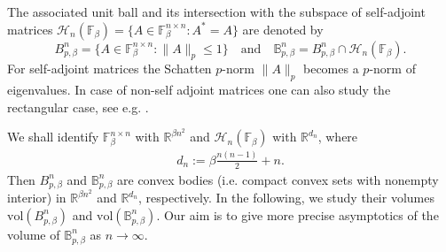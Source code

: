 \documentclass[a4paper,12pt,reqno]{amsart}
\theoremstyle{definition}
\newcommand{\IF}{\mathbb{F}}
\newcommand{\IR}{\mathbb{R}}
\newcommand{\cH}{\mathcal{H}}
\newcommand{\vol}{\mathrm{vol}}
\newcommand{\bpb}{\mathbb{B}_{p,\beta}^n}
\begin{document}
The associated unit ball and its intersection with the subspace of self-adjoint matrices $\cH_n(\IF_{\beta})=\{A\in \IF_{\beta}^{n\times n}\colon A^{*}=A\}$  are denoted by
\[
B_{p,\beta}^n
=\{A\in \IF_{\beta}^{n\times n}\colon \|A\|_p\le 1\}\quad \text{and}\quad
\bpb
= B_{p,\beta}^n \cap \cH_n(\IF_{\beta}).
\]
For self-adjoint matrices the Schatten $p$-norm $\|A\|_p$ becomes a $p$-norm of eigenvalues. In case of non-self adjoint matrices one can also study the rectangular case, see e.g. \cite{JKP24}.

We shall identify $\IF_{\beta}^{n\times n}$ with $\IR^{\beta n^2}$ and $\cH_n(\IF_{\beta})$ with $\IR^{d_n}$, where 
\begin{align}\label{eq:dn}
d_n:=\beta\frac{n(n-1)}{2}+n.
\end{align}
Then $B_{p,\beta}^n$ and $\bpb$ are convex bodies (i.e. compact convex sets with nonempty interior) in $\IR^{\beta n^2}$ and $\IR^{d_n}$, respectively. In the following, we study their volumes $\vol(B_{p,\beta}^n)$ and $\vol(\bpb)$. Our aim is to give more precise asymptotics of the volume of $\bpb$ as $n\to \infty$.
\end{document}
